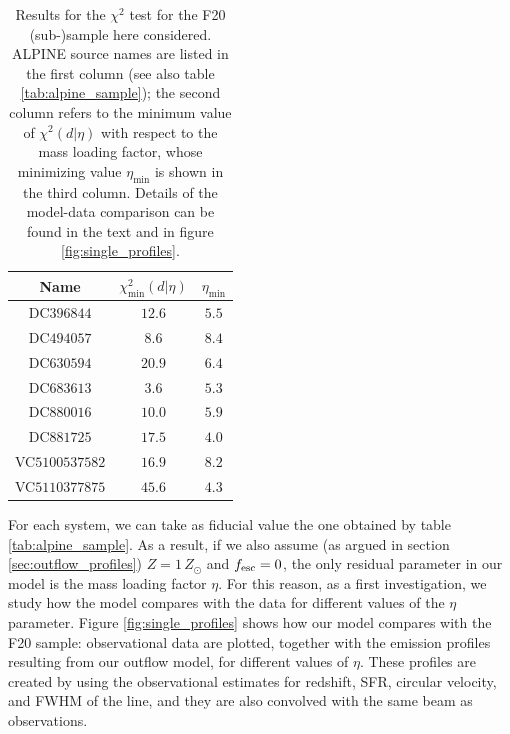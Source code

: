 \begin{table}
\centering
%
\begin{tabular}{ c c c }
\hline
Name      & $\chi^2_\mathrm{min}(d|\eta)$  & $\eta_\mathrm{min}$  \\ 
\hline
\hline
DC$396844$      &    $12.6$  &    $5.5$ \\
DC$494057$      &    $8.6$  &    $8.4$ \\
DC$630594$      &    $20.9$ &    $6.4$  \\
DC$683613$      &    $3.6$ &    $5.3$   \\
DC$880016$     &    $10.0$  &    $5.9$  \\
DC$881725$    &    $17.5$  &    $4.0$    \\
VC$5100537582$   &   $16.9$   &    $8.2$   \\
VC$5110377875$    &    $45.6$  &    $4.3$   \\
 \hline
\end{tabular}
\caption{Results for the $\chi^2$ test for the F20 \citep{Fujimoto:2020qzo} (sub-)sample here considered. ALPINE source names are listed in the first column (see also table \ref{tab:alpine_sample}); the second column refers to the minimum value of $\chi^2(d|\eta)$ with respect to the mass loading factor, whose minimizing value $\eta_\mathrm{min}$ is shown in the third column. Details of the model-data comparison can be found in the text and in figure \ref{fig:single_profiles}. 
\label{tab:alpine_chi2}
}
\end{table}

For each system, we can take as fiducial value the one obtained by table \ref{tab:alpine_sample}. As a result, if we also assume (as argued in section \ref{sec:outflow_profiles}) $Z= 1\,Z_\odot$ and $f_{\rm esc}=0$, the only residual parameter in our model is the mass loading factor $\eta$. For this reason, as a first investigation, we study how the model compares with the data for different values of the $\eta$ parameter. Figure \ref{fig:single_profiles} shows how our model compares with the F20 sample: observational data are plotted, together with the emission profiles resulting from our outflow model, for different values of $\eta$. These profiles are created by using the observational estimates for redshift, SFR, circular velocity, and FWHM of the \CII line, and they are also convolved with the same beam as observations. 


